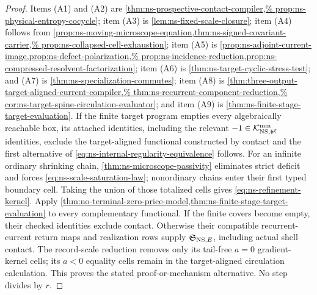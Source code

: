 \documentclass[11pt]{article}
\numberwithin{section}{part}
\theoremstyle{plain}
\theoremstyle{definition}
\theoremstyle{remark}
\begin{document}
\begin{proof}
Items \textup{(A1)} and \textup{(A2)} are
\cref{thm:ns-prospective-contact-compiler,%
prop:ns-physical-entropy-cocycle}; item \textup{(A3)} is
\cref{lem:ns-fixed-scale-closure}; item \textup{(A4)} follows from
\cref{prop:ns-moving-microscope-equation,thm:ns-signed-covariant-carrier,%
prop:ns-collapsed-cell-exhaustion}; item \textup{(A5)} is
\cref{prop:ns-adjoint-current-image,prop:ns-defect-polarization,%
prop:ns-incidence-reduction,prop:ns-compressed-resolvent-factorization}; item
\textup{(A6)} is \cref{thm:ns-target-cyclic-stress-test}; and
\textup{(A7)} is \cref{thm:ns-specialization-commutes}; item \textup{(A8)} is
\cref{thm:three-output-target-aligned-current-compiler,%
thm:ns-recurrent-component-reduction,%
cor:ns-target-spine-circulation-evaluator}; and item \textup{(A9)} is
\cref{thm:ns-finite-stage-target-evaluation}.
If the finite target program empties every algebraically reachable box, its
attached identities, including the relevant
\(-1\in\mathcal K^{\min}_{{\rm NS},\mathfrak b^\xi}\) identities, exclude the
target-aligned functional constructed by contact and the first alternative of
\eqref{eq:ns-internal-regularity-equivalence} follows.  For an infinite
ordinary shrinking chain,
\cref{thm:ns-microscope-passivity} eliminates strict deficit and forces
\eqref{eq:ns-scale-saturation-law}; nonordinary chains enter their first
typed boundary cell.  Taking the union of those totalized cells gives
\eqref{eq:ns-refinement-kernel}.  Apply
\cref{thm:no-terminal-zero-price-model,thm:ns-finite-stage-target-evaluation}
to every complementary functional.  If the finite covers become empty, their
checked identities exclude contact.  Otherwise their compatible
recurrent-current return maps and realization rows supply
\(\mathfrak S_{{\rm NS},E}\), including actual shell contact.  The record-scale
reduction removes only its tail-free \(a=0\) gradient-kernel cells; its
\(a<0\) equality cells remain in the target-aligned circulation calculation.
This proves the stated proof-or-mechanism alternative.  No step divides by
\(r\).
\end{proof}
\end{document}
